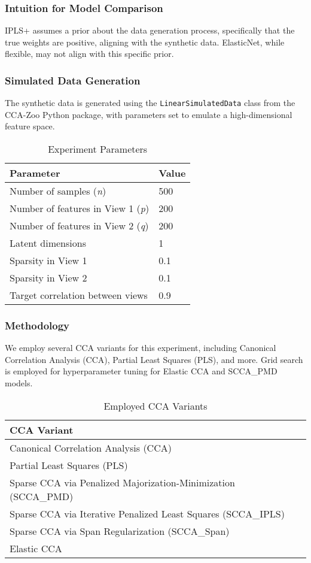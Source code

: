 \subsubsection{Intuition for Model Comparison}
IPLS+ assumes a prior about the data generation process, specifically that the true weights are positive, aligning with the synthetic data. ElasticNet, while flexible, may not align with this specific prior.

\subsubsection{Simulated Data Generation}\label{subsubsec:simulated-data-generation}
The synthetic data is generated using the \texttt{LinearSimulatedData} class from the CCA-Zoo Python package, with parameters set to emulate a high-dimensional feature space.

\begin{table}[h]
\centering
\caption{Experiment Parameters}
\begin{tabular}{l|l}
\textbf{Parameter} & \textbf{Value} \\
\hline
Number of samples (\textit{n}) & 500 \\
Number of features in View 1 (\textit{p}) & 200 \\
Number of features in View 2 (\textit{q}) & 200 \\
Latent dimensions & 1 \\
Sparsity in View 1 & 0.1 \\
Sparsity in View 2 & 0.1 \\
Target correlation between views & 0.9 \\
\end{tabular}
\label{table:experiment-parameters}
\end{table}

\subsubsection{Methodology}
We employ several CCA variants for this experiment, including Canonical Correlation Analysis (CCA), Partial Least Squares (PLS), and more. Grid search is employed for hyperparameter tuning for Elastic CCA and SCCA\_PMD models.

\begin{table}[h]
\centering
\caption{Employed CCA Variants}
\begin{tabular}{l}
\textbf{CCA Variant} \\
\hline
Canonical Correlation Analysis (CCA) \\
Partial Least Squares (PLS) \\
Sparse CCA via Penalized Majorization-Minimization (SCCA\_PMD) \\
Sparse CCA via Iterative Penalized Least Squares (SCCA\_IPLS) \\
Sparse CCA via Span Regularization (SCCA\_Span) \\
Elastic CCA \\
\end{tabular}
\label{table:cca-variants}
\end{table}

